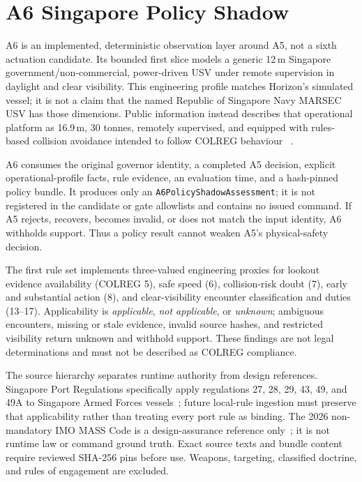 \documentclass[sigconf,nonacm]{acmart}
\begin{document}
\section{A6 Singapore Policy Shadow}
A6 is an implemented, deterministic observation layer around A5, not a sixth
actuation candidate. Its bounded first slice models a generic 12\,m Singapore
government/non-commercial, power-driven USV under remote supervision in
daylight and clear visibility. This engineering profile matches Horizon's
simulated vessel; it is not a claim that the named Republic of Singapore Navy
MARSEC USV has those dimensions. Public information instead describes that
operational platform as 16.9\,m, 30 tonnes, remotely supervised, and equipped
with rules-based collision avoidance intended to follow COLREG behaviour
~\cite{rsnusv}.

A6 consumes the original governor identity, a completed A5 decision, explicit
operational-profile facts, rule evidence, an evaluation time, and a hash-pinned
policy bundle. It produces only an \texttt{A6PolicyShadowAssessment}; it is not
registered in the candidate or gate allowlists and contains no issued command.
If A5 rejects, recovers, becomes invalid, or does not match the input identity,
A6 withholds support. Thus a policy result cannot weaken A5's physical-safety
decision.

The first rule set implements three-valued engineering proxies for lookout
evidence availability (COLREG 5), safe speed (6), collision-risk doubt (7),
early and substantial action (8), and clear-visibility encounter classification
and duties (13--17). Applicability is \emph{applicable},
\emph{not applicable}, or \emph{unknown}; ambiguous encounters, missing or
stale evidence, invalid source hashes, and restricted visibility return unknown
and withhold support. These findings are not legal determinations and must not
be described as COLREG compliance.

The source hierarchy separates runtime authority from design references.
Singapore Port Regulations specifically apply regulations 27, 28, 29, 43, 49,
and 49A to Singapore Armed Forces vessels~\cite{sgport}; future local-rule
ingestion must preserve that applicability rather than treating every port rule
as binding. The 2026 non-mandatory IMO MASS Code is a design-assurance reference
only~\cite{mass}; it is not runtime law or command ground truth. Exact source
texts and bundle content require reviewed SHA-256 pins before use. Weapons,
targeting, classified doctrine, and rules of engagement are excluded.
\end{document}
